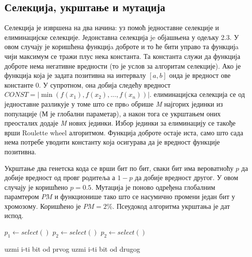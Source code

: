 \documentclass{article}
\begin{document}
\subsection{Селекција, укрштање и мутација}
Селекција је извршена на два начина: уз помоћ једноставне селекције и елиминацијске селекције.
Једонставна селекција je објашњена у одељку 2.3. У овом случају је коришћена функцијa доброте и то ће бити управо 
та функцијa чији максимум се тражи плус нека константа. Та константа служи да функција доброте
нема негативне вредности (то је услов за алгоритам селекције). 
Ако је функција која је задата позитивна на интервалу $[a, b]$ онда је вредност 
ове константе 0. У супротном, она добија следећу вредност $CONST = |\min(f(x_1), f(x_2), ..., f(x_n))|$.
елиминацијска селекција се од једноставне разликује у томе што се првo
обрише \textit{M} најгорих јединки из популације (М је глобални параметар), а након тога се укрштањем оних преосталих додаје
\textit{M} нових јединки. Избор јединки за елиминацију се такође врши Roulette wheel алгоритмом.
Функција доброте остаје иста, само што сада нема потребе уводити константу која осигурава да је вредност функције позитивна.

Укрштање два генетска кода се врши бит по бит, сваки бит има вероватноћу  $p$
да добије вредност од провг родитеља а $1 - p$ да добије вредност другог. У овом
случају је коришћено $p = 0.5$. Мутација је поново одређена глобалним парамтером $PM$ 
и функционише тако што се насумично промени један бит у хромозому. Коришћено је 
$PM = 2\%$. Псеудокод алгоритма укрштања је дат испод.
\newline
\begin{algorithmic}
    \State $p_1 \gets select()$
    \State $p_2 \gets select()$
        \State $p_2 \gets select()$
    \EndWhile
    
            \State uzmi i-ti bit od prvog 
        \Else
            \State uzmi i-ti bit od drugog
        \EndIf
    \EndFor
\end{algorithmic}
\end{document}
